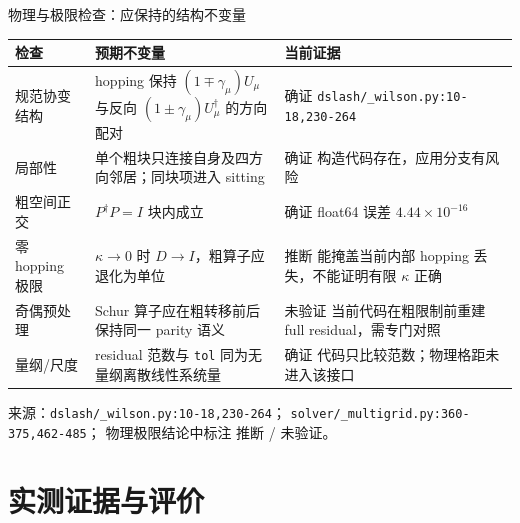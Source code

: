 \documentclass[UTF8,aspectratio=169,11pt]{ctexbeamer}
\newcommand{\source}[1]{%
  \vspace{0.06em}\par{\raggedright\scriptsize\color{muted}来源：#1\par}}
\newcommand{\pathref}[1]{\nolinkurl{#1}}
\newcommand{\verified}{\textcolor{evidence}{确证}}
\newcommand{\inferred}{\textcolor{accent}{推断}}
\newcommand{\unverified}{\textcolor{warn}{未验证}}
\begin{document}
\begin{frame}[t]{物理与极限检查：应保持的结构不变量}
  \begin{center}
    \scriptsize
    \begin{tabular}{@{}P{0.15\textwidth}P{0.53\textwidth}P{0.24\textwidth}@{}}
      \toprule
      检查 & 预期不变量 & 当前证据 \\
      \midrule
      规范协变结构 & hopping 保持 $(1\mp\gamma_\mu)U_\mu$ 与反向
      $(1\pm\gamma_\mu)U^\dagger_\mu$ 的方向配对 & \verified{} \pathref{dslash/_wilson.py:10-18,230-264} \\
      局部性 & 单个粗块只连接自身及四方向邻居；同块项进入 sitting & \verified{} 构造代码存在，应用分支有风险 \\
      粗空间正交 & $P^\dagger P=I$ 块内成立 & \verified{} float64 误差 $4.44\times10^{-16}$ \\
      零 hopping 极限 & $\kappa\to0$ 时 $D\to I$，粗算子应退化为单位 & \inferred{} 能掩盖当前内部 hopping 丢失，不能证明有限 $\kappa$ 正确 \\
      奇偶预处理 & Schur 算子应在粗转移前后保持同一 parity 语义 & \unverified{} 当前代码在粗限制前重建 full residual，需专门对照 \\
      量纲/尺度 & residual 范数与 \texttt{tol} 同为无量纲离散线性系统量 & \verified{} 代码只比较范数；物理格距未进入该接口 \\
      \bottomrule
    \end{tabular}
  \end{center}
  \source{\pathref{dslash/_wilson.py:10-18,230-264}；
  \pathref{solver/_multigrid.py:360-375,462-485}；
  物理极限结论中标注 \inferred{} / \unverified{}。}
\end{frame}

\section{实测证据与评价}
\end{document}
